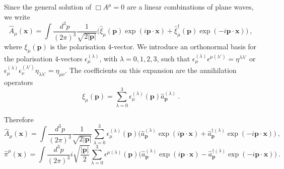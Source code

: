     Since the general solution of $\Box A^\mu = 0$ are a linear combinations of plane waves, we write 
    \begin{equation*}
        \hat A_\mu (\mathbf x) = \int \frac{d^3 p}{(2\pi)^3} \frac{1}{\sqrt{2 |\mathbf p|}} \Big ( \hat \xi_\mu (\mathbf p) \exp(i \mathbf p \cdot \mathbf x) + \hat \xi_\mu^\dagger (\mathbf p) \exp(- i \mathbf p \cdot \mathbf x)) ~,
    \end{equation*}
    where $\xi_\mu (\mathbf p)$ is the polarisation $4$-vector. We introduce an orthonormal basis for the polarisation $4$-vectors $\epsilon_\mu^{(\lambda)}$, with $\lambda = 0, 1, 2, 3$, such that $\epsilon_\mu^{(\lambda)} \epsilon^{\mu (\lambda')} = \eta^{\lambda \lambda'}$ or $\epsilon_\mu^{(\lambda)} \epsilon_\nu^{(\lambda')} \eta_{\lambda \lambda'} = \eta_{\mu\nu}$. The coefficients on this expansion are the annihilation operators
    \begin{equation*}
        \hat \xi_\mu (\mathbf p) = \sum_{\lambda=0}^3 \epsilon_\mu^{(\lambda)} (\mathbf p) \hat a_{\mathbf p}^{(\lambda)} ~.
    \end{equation*}

    Therefore 
    \begin{equation*}
        \hat A_\mu (\mathbf x) = \int \frac{d^3 p}{(2\pi)^3} \frac{1}{\sqrt{2 |\mathbf p|}} \sum_{\lambda=0}^{3} \epsilon_\mu^{(\lambda)} (\mathbf p) \Big ( \hat a_{\mathbf p}^{(\lambda)} \exp(i \mathbf p \cdot \mathbf x) + \hat a_{\mathbf p}^{\dagger (\lambda)}  \exp(- i \mathbf p \cdot \mathbf x) \Big)  ~,
    \end{equation*}
    \begin{equation*}
        \hat \pi^\mu (\mathbf x) = \int \frac{d^3 p}{(2\pi)^3} i \sqrt{\frac{|\mathbf p|}{2}} \sum_{\lambda=0}^{3} \epsilon^{\mu(\lambda)} (\mathbf p) \Big ( \hat a_{\mathbf p}^{(\lambda)} \exp(i \mathbf p \cdot \mathbf x) - \hat a_{\mathbf p}^{\dagger (\lambda)}  \exp(- i \mathbf p \cdot \mathbf x) \Big)  ~.
    \end{equation*}

